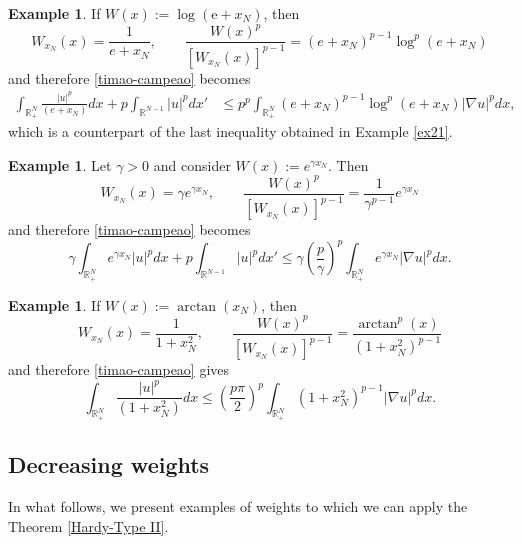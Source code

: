 \documentclass[12pt]{amsart}
\theoremstyle{definition}
\newtheorem{example}[theorem]{Example}
\theoremstyle{plain}
\begin{document}
 \begin{example}  
    If $W(x):=\log(\mathrm{e}+x_N)$, then 
		$$
		W_{x_N}(x)=\frac{1}{e+x_N},\qquad \frac{W(x)^p}{[W_{x_N}(x)]^{p-1}}=(e+x_N)^{p-1} \log^p(e+x_N)
        $$
		and therefore \eqref{timao-campeao} becomes
		\begin{align*}
			\int_{\mathbb{R}^N_+} \frac{|u|^p}{(e+x_N)}dx+ p \int_{\mathbb{R}^{N-1}} |u|^{p}dx'&\leq p^p \int_{\mathbb{R}^N_+} (e+x_N)^{p-1} \log^p(e+x_N)|\nabla u|^pdx,
		\end{align*}
		which is a counterpart of the last inequality obtained in Example \ref{ex21}.
\end{example}
    
 \begin{example}
      Let $\gamma>0$ and consider
		$W(x):=e^{\gamma x_N}$. Then
		$$
		W_{x_N}(x)=\gamma e^{\gamma x_N}, \qquad \frac{W(x)^p}{[W_{x_N}(x)]^{p-1}} =\frac{1}{\gamma^{p-1}}e^{\gamma x_N}
		$$
		and therefore \eqref{timao-campeao} becomes
		$$
			\gamma\int_{\mathbb{R}^N_+} e^{\gamma x_N}|u|^pdx+p\int_{\mathbb{R}^{N-1}} |u|^{p}dx'\leq \gamma \left( \frac{p}{\gamma}\right)^p \int_{\mathbb{R}^{N}_+}e^{\gamma x_N}|\nabla u|^pdx.
		$$
 \end{example}


\begin{example}
    If $W(x):=\arctan(x_N)$, then
		$$
			W_{x_N}(x)=\frac{1}{1+x_N^2},\qquad \frac{W(x)^p}{[W_{x_N}(x)]^{p-1}}= \frac{\arctan^p (x)}{(1+x_N^2)^{p-1}}
		$$
		and therefore \eqref{timao-campeao} gives
		$$
			\int_{\mathbb{R}^N_+} \frac{|u|^p}{(1+x_N^2)}dx\leq \left(\frac{p\pi}{2}\right)^p\int_{\mathbb{R}^{N}_+}(1+x_N^2)^{p-1}|\nabla u|^pdx.
		$$
\end{example}
		


 \subsection{Decreasing weights}

In what follows, we present examples of weights to which we can apply the Theorem \ref{Hardy-Type II}.
\end{document}
